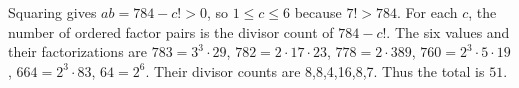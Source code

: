 Squaring gives $ab=784-c!>0$, so $1\le c\le6$ because $7!>784$. For each $c$, the number of ordered factor pairs is the divisor count of $784-c!$. The six values and their factorizations are $783=3^3\cdot29$, $782=2\cdot17\cdot23$, $778=2\cdot389$, $760=2^3\cdot5\cdot19$, $664=2^3\cdot83$, $64=2^6$. Their divisor counts are 8,8,4,16,8,7. Thus the total is $\boxed{51}$.
